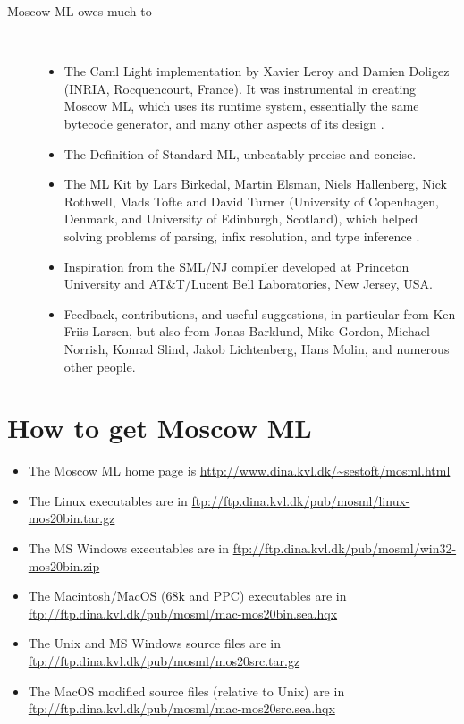 \documentclass[fleqn,a4paper]{article}
\begin{document}
\begin{description}
\item[Moscow ML owes much to]\mbox{ }
\begin{itemize}
\item The Caml Light implementation by Xavier Leroy and Damien Doligez
  (INRIA, Rocquencourt, France).  It was instrumental in creating
  Moscow ML, which uses its runtime system, essentially the same
  bytecode generator, and many other aspects of its design
  \cite{Leroy:1990:TheZinc,Leroy:1993:TheCaml}.
\item The Definition of Standard ML, unbeatably precise and concise.
\item The ML Kit by Lars Birkedal, Martin Elsman, Niels Hallenberg,
  Nick Rothwell, Mads Tofte and David Turner (University of
  Copenhagen, Denmark, and University of Edinburgh, Scotland), which
  helped solving problems of parsing, infix resolution, and type
  inference \cite{Birkedal:1993:TheML}.
\item Inspiration from the SML/NJ compiler developed at Princeton
  University and AT\&T/Lucent Bell Laboratories, New Jersey,
  USA.
\item Feedback, contributions, and useful suggestions, in particular
  from Ken Friis Larsen, but also from Jonas Barklund, Mike Gordon,
  Michael Norrish, Konrad Slind, Jakob Lichtenberg, Hans Molin, and 
  numerous other people.
\end{itemize}
\end{description}


\section{How to get Moscow ML}
\label{sec-how-to-get}

\begin{itemize}
\item The Moscow ML home page is
        \url{http://www.dina.kvl.dk/~sestoft/mosml.html}
\item The Linux executables are in
        \url{ftp://ftp.dina.kvl.dk/pub/mosml/linux-mos20bin.tar.gz}
\item The MS Windows executables are in 
        \url{ftp://ftp.dina.kvl.dk/pub/mosml/win32-mos20bin.zip}
\item The Macintosh/MacOS (68k and PPC) executables are in\\
        \url{ftp://ftp.dina.kvl.dk/pub/mosml/mac-mos20bin.sea.hqx}
\item The Unix and MS Windows source files are in 
        \url{ftp://ftp.dina.kvl.dk/pub/mosml/mos20src.tar.gz}
\item The MacOS modified source files (relative to Unix) are in\\
        \url{ftp://ftp.dina.kvl.dk/pub/mosml/mac-mos20src.sea.hqx}
\end{itemize}
\end{document}
